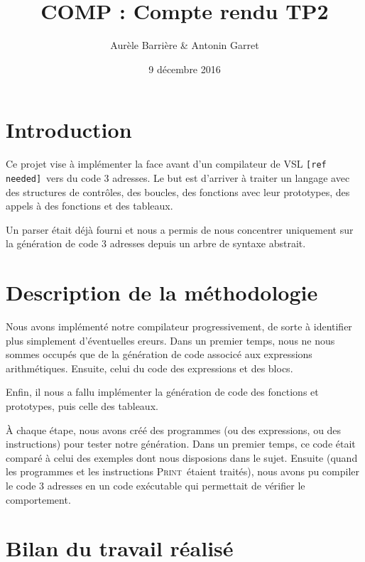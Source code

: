 \documentclass[french]{article}
\title{COMP : Compte rendu TP2}
\author{Aurèle Barrière \& Antonin Garret}
\date{9 décembre 2016}
\begin{document}
\maketitle

\def\refneeded{\texttt{[ref needed]}}
\def\iprint{\textsc{Print}}
\def\iread{\textsc{Read}}
\def\return{\textsc{Return}}

\section{Introduction}
Ce projet vise à implémenter la face avant d'un compilateur de VSL \refneeded\ vers du code 3 adresses.
Le but est d'arriver à traiter un langage avec des structures de contrôles, des boucles, des fonctions avec leur prototypes, des appels à des fonctions et des tableaux.

Un parser était déjà fourni et nous a permis de nous concentrer uniquement sur la génération de code 3 adresses depuis un arbre de syntaxe abstrait.


\section{Description de la méthodologie}
Nous avons implémenté notre compilateur progressivement, de sorte à identifier plus simplement d'éventuelles ereurs. Dans un premier temps, nous ne nous sommes occupés que de la génération de code associcé aux expressions arithmétiques. Ensuite, celui du code des expressions et des blocs.

Enfin, il nous a fallu implémenter la génération de code des fonctions et prototypes, puis celle des tableaux.

À chaque étape, nous avons créé des programmes (ou des expressions, ou des instructions) pour tester notre génération. Dans un premier temps, ce code était comparé à celui des exemples dont nous disposions dans le sujet. Ensuite (quand les programmes et les instructions \iprint\ étaient traités), nous avons pu compiler le code 3 adresses en un code exécutable qui permettait de vérifier le comportement.


\section{Bilan du travail réalisé}
\end{document}
